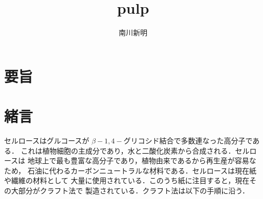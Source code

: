 \documentclass[uplatex, dvipdfmx, 10pt]{jarticle}
\title{pulp}
\author{南川新明}
\begin{document}
            \begin{titlepage}
                \begin{center}

                    \vspace{10truept}


                    \vspace*{180truept}


                    \vspace{100truept}
                    

                    \vspace{10truept}


                    \vspace{70truept}
                    

                    \vspace{10truept}

                \end{center}
            \end{titlepage}
        
        \section*{要旨}

        \section*{緒言}
            
            セルロースはグルコースが $\beta-1,4-$グリコシド結合で多数連なった高分子である．
            これは植物細胞の主成分であり，水と二酸化炭素から合成される．セルロースは
            地球上で最も豊富な高分子であり，植物由来であるから再生産が容易なため，
            石油に代わるカーボンニュートラルな材料である．セルロースは現在紙や繊維の材料として
            大量に使用されている．このうち紙に注目すると，現在その大部分がクラフト法で
            製造されている．クラフト法は以下の手順に沿う．\cite{nihonseisi}\cite{hyougopulp}\cite{kagakuprocess}
\end{document}

